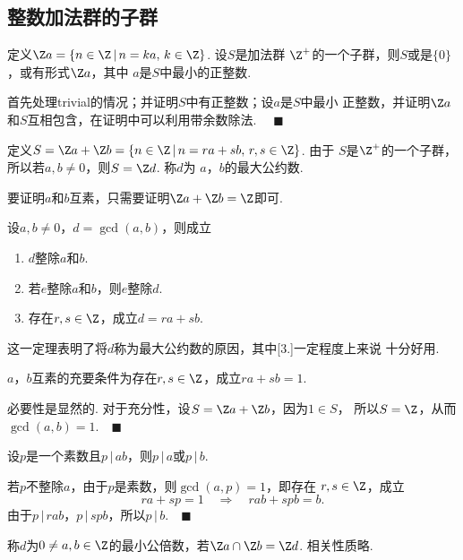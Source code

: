 \subsection{整数加法群的子群}

  \begin{thm}
    定义$\Z a=\{n\in\Z\,|\,n=ka,\,k\in\Z\}$. 设$S$是加法群
    $\Z^+$的一个子群，则$S$或是$\{0\}$，或有形式$\Z a$，其中
    $a$是$S$中最小的正整数.
  \end{thm}
  \proof
    首先处理trivial的情况；并证明$S$中有正整数；设$a$是$S$中最小
    正整数，并证明$\Z a$和$S$互相包含，在证明中可以利用带余数除法.
    $\quad\blacksquare$

  \begin{defi}[最大公约数]
    定义$S=\Z a+\Z b=\{n\in\Z\,|\,n=ra+sb,\,r,s\in\Z\}$. 由于
    $S$是$\Z^+$的一个子群，所以若$a,b\ne 0$，则$S=\Z d$. 称$d$为
    $a$，$b$的最大公约数.
  \end{defi}
  \remark
    要证明$a$和$b$互素，只需要证明$\Z a+\Z b = \Z$即可.

  \begin{thm}[最大公约数]
    设$a,b\ne 0$，$d=\gcd(a, b)$，则成立
    \begin{enumerate}
      \item $d$整除$a$和$b$.
      \item 若$e$整除$a$和$b$，则$e$整除$d$.
      \item 存在$r,s\in\Z$，成立$d=ra+sb$.
    \end{enumerate}
  \end{thm}
  \remark
    这一定理表明了将$d$称为最大公约数的原因，其中[3.]一定程度上来说
    十分好用.

  \begin{cor}[互素]
    \label{cor: 互素}
    $a$，$b$互素的充要条件为存在$r,s\in\Z$，成立$ra+sb=1$.
  \end{cor}
  \proof
    必要性是显然的. 对于充分性，设$S=\Z a+\Z b$，因为$1\in S$，
    所以$S=\Z$，从而$\gcd(a, b)=1$.$\quad\blacksquare$

  \begin{cor}
    设$p$是一个素数且$p\,|\,ab$，则$p\,|\,a$或$p\,|\,b$.
  \end{cor}
  \proof
    若$p$不整除$a$，由于$p$是素数，则$\gcd(a,p)=1$，即存在
    $r,s\in\Z$，成立
    \[
      ra+sp = 1 \quad\Rightarrow\quad rab+spb=b.
    \]
    由于$p\,|\,rab$，$p\,|\,spb$，所以$p\,|\,b$.$\quad\blacksquare$

  \begin{defi}[最小公倍数]
    称$d$为$0\ne a,b\in\Z$的最小公倍数，若$\Z a\cap\Z b=\Z d$.
    相关性质略.
  \end{defi}

